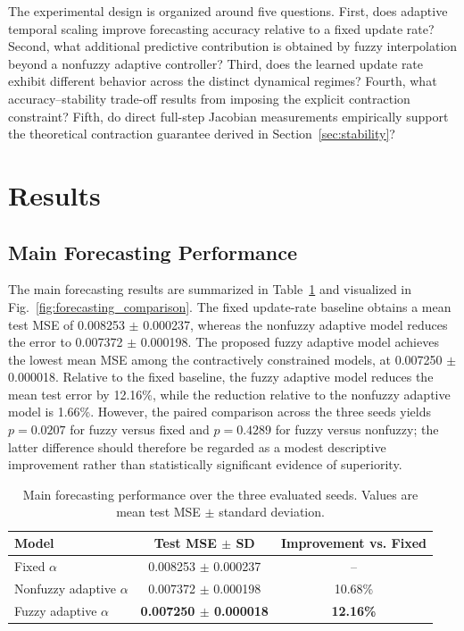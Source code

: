 \documentclass[journal]{IEEEtran}
\begin{document}
The experimental design is organized around five questions. First, does adaptive temporal scaling improve forecasting accuracy relative to a fixed update rate? Second, what additional predictive contribution is obtained by fuzzy interpolation beyond a nonfuzzy adaptive controller? Third, does the learned update rate exhibit different behavior across the distinct dynamical regimes? Fourth, what accuracy--stability trade-off results from imposing the explicit contraction constraint? Fifth, do direct full-step Jacobian measurements empirically support the theoretical contraction guarantee derived in Section~\ref{sec:stability}?
	
	
	
	\section{Results}
	\label{sec:results}
	
	\subsection{Main Forecasting Performance}
	\label{subsec:main_results}
	
	The main forecasting results are summarized in Table~\ref{tab:main_forecasting} and visualized in Fig.~\ref{fig:forecasting_comparison}. The fixed update-rate baseline obtains a mean test MSE of 0.008253 $\pm$ 0.000237, whereas the nonfuzzy adaptive model reduces the error to 0.007372 $\pm$ 0.000198. The proposed fuzzy adaptive model achieves the lowest mean MSE among the contractively constrained models, at 0.007250 $\pm$ 0.000018. Relative to the fixed baseline, the fuzzy adaptive model reduces the mean test error by 12.16\%, while the reduction relative to the nonfuzzy adaptive model is 1.66\%. However, the paired comparison across the three seeds yields $p=0.0207$ for fuzzy versus fixed and $p=0.4289$ for fuzzy versus nonfuzzy; the latter difference should therefore be regarded as a modest descriptive improvement rather than statistically significant evidence of superiority.
	
	\begin{table}[t]
		\centering
		\caption{Main forecasting performance over the three evaluated seeds. Values are mean test MSE $\pm$ standard deviation.}
\label{tab:main_forecasting}
\begin{tabular}{lcc}
\toprule
Model & Test MSE $\pm$ SD & Improvement vs. Fixed \\
\midrule
Fixed $\alpha$ & 0.008253 $\pm$ 0.000237 & -- \\
Nonfuzzy adaptive $\alpha$ & 0.007372 $\pm$ 0.000198 & 10.68\% \\
Fuzzy adaptive $\alpha$ & \textbf{0.007250 $\pm$ 0.000018} & \textbf{12.16\%} \\
\bottomrule
\end{tabular}
	\end{table}
	
\end{document}
